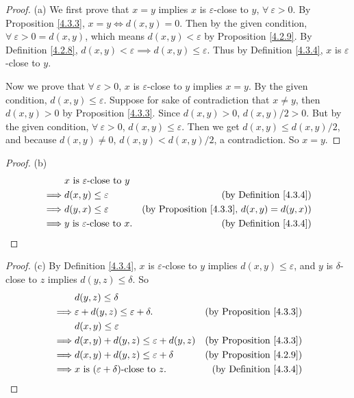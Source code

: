 \begin{proof}{(a)}
We first prove that \(x = y\) implies \(x\) is \(\varepsilon\)-close to \(y\), \(\forall\ \varepsilon > 0\).
By Proposition \ref{4.3.3}, \(x = y \iff d(x, y) = 0\).
Then by the given condition, \(\forall\ \varepsilon > 0 = d(x, y)\), which means \(d(x, y) < \varepsilon\) by Proposition \ref{4.2.9}.
By Definition \ref{4.2.8}, \(d(x, y) < \varepsilon \implies d(x, y) \leq \varepsilon\).
Thus by Definition \ref{4.3.4}, \(x\) is \(\varepsilon\)-close to \(y\).

Now we prove that \(\forall\ \varepsilon > 0\), \(x\) is \(\varepsilon\)-close to \(y\) implies \(x = y\).
By the given condition, \(d(x, y) \leq \varepsilon\).
Suppose for sake of contradiction that \(x \neq y\), then \(d(x, y) > 0\) by Proposition \ref{4.3.3}.
Since \(d(x, y) > 0\), \(d(x, y) / 2 > 0\).
But by the given condition, \(\forall\ \varepsilon > 0\), \(d(x, y) \leq \varepsilon\).
Then we get \(d(x, y) \leq d(x, y) / 2\), and because \(d(x, y) \neq 0\), \(d(x, y) < d(x, y) / 2\), a contradiction.
So \(x = y\).
\end{proof}

\begin{proof}{(b)}
\begin{align*}
& x \text{ is \(\varepsilon\)-close to } y \\
\implies & d(x, y) \leq \varepsilon & \text{(by Definition \ref{4.3.4})} \\
\implies & d(y, x) \leq \varepsilon & \text{(by Proposition \ref{4.3.3}, \(d(x, y) = d(y, x)\))} \\
\implies & y \text{ is \(\varepsilon\)-close to } x. & \text{(by Definition \ref{4.3.4})}
\end{align*}
\end{proof}

\begin{proof}{(c)}
By Definition \ref{4.3.4}, \(x\) is \(\varepsilon\)-close to \(y\) implies \(d(x, y) \leq \varepsilon\), and \(y\) is \(\delta\)-close to \(z\) implies \(d(y, z) \leq \delta\).
So
\begin{align*}
& d(y, z) \leq \delta \\
\implies & \varepsilon + d(y, z) \leq \varepsilon + \delta. & \text{(by Proposition \ref{4.3.3})} \\
& d(x, y) \leq \varepsilon \\
\implies & d(x, y) + d(y, z) \leq \varepsilon + d(y, z) & \text{(by Proposition \ref{4.3.3})} \\
\implies & d(x, y) + d(y, z) \leq \varepsilon + \delta & \text{(by Proposition \ref{4.2.9})} \\
\implies & x \text{ is \((\varepsilon + \delta)\)-close to } z. & \text{(by Definition \ref{4.3.4})}
\end{align*}
\end{proof}

